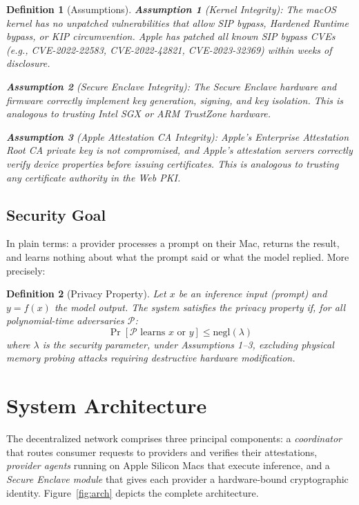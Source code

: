 \documentclass[10pt,twocolumn,letterpaper]{article}
\newtheorem{definition}{Definition}
\begin{document}
\begin{definition}[Assumptions]
\label{asm:kernel}
\textbf{Assumption 1} (Kernel Integrity): The macOS kernel has no unpatched vulnerabilities that allow SIP bypass, Hardened Runtime bypass, or KIP circumvention. Apple has patched all known SIP bypass CVEs (e.g., CVE-2022-22583, CVE-2022-42821, CVE-2023-32369) within weeks of disclosure.

\textbf{Assumption 2} (Secure Enclave Integrity): The Secure Enclave hardware and firmware correctly implement key generation, signing, and key isolation. This is analogous to trusting Intel SGX or ARM TrustZone hardware.

\textbf{Assumption 3} (Apple Attestation CA Integrity): Apple's Enterprise Attestation Root CA private key is not compromised, and Apple's attestation servers correctly verify device properties before issuing certificates. This is analogous to trusting any certificate authority in the Web PKI.
\end{definition}

\subsection{Security Goal}

In plain terms: a provider processes a prompt on their Mac, returns the result, and learns nothing about what the prompt said or what the model replied. More precisely:

\begin{definition}[Privacy Property]
\label{def:privacy}
Let $x$ be an inference input (prompt) and $y = f(x)$ the model output. The system satisfies the \emph{privacy property} if, for all polynomial-time adversaries $\mathcal{P}$:
\begin{equation}
\Pr[\mathcal{P} \text{ learns } x \text{ or } y] \leq \text{negl}(\lambda)
\end{equation}
where $\lambda$ is the security parameter, under Assumptions 1--3, excluding physical memory probing attacks requiring destructive hardware modification.
\end{definition}

\section{System Architecture}
\label{sec:arch}

The decentralized network comprises three principal components: a \emph{coordinator} that routes consumer requests to providers and verifies their attestations, \emph{provider agents} running on Apple Silicon Macs that execute inference, and a \emph{Secure Enclave module} that gives each provider a hardware-bound cryptographic identity. Figure~\ref{fig:arch} depicts the complete architecture.
\end{document}
